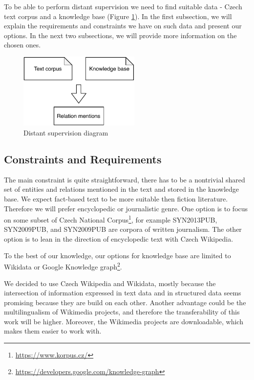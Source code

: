 To be able to perform distant supervision we need to find suitable data - Czech text corpus and a knowledge base (Figure \ref{obr03:DSD}). In the first subsection, we will explain the requirements and constraints we have on such data and present our options. In the next two subsections, we will provide more information on the chosen ones.

\begin{figure}[h]\centering
\includegraphics[width=60mm]{./img//Diplomka diagramy-Distant supervision}
\caption{Distant supervision diagram}
\label{obr03:DSD}
\end{figure}

\subsection{Constraints and Requirements}
The main constraint is quite straightforward, there has to be a nontrivial shared set of entities and relations mentioned in the text and stored in the knowledge base. We expect fact-based text to be more suitable then fiction literature. Therefore we will prefer encyclopedic or journalistic genre. One option is to focus on some subset of Czech National Corpus\footnote{\url{https://www.korpus.cz/}}, for example SYN2013PUB, SYN2009PUB, and SYN2009PUB are corpora of written journalism. The other option is to lean in the direction of encyclopedic text with Czech Wikipedia.

To the best of our knowledge, our options for knowledge base are limited to Wikidata or Google Knowledge graph\footnote{\url{https://developers.google.com/knowledge-graph}}.

We decided to use Czech Wikipedia and Wikidata, mostly because the intersection of information expressed in text data and in structured data seems promising because they are build on each other. Another advantage could be the multilingualism of Wikimedia projects, and therefore the transferability of this work will be higher. Moreover, the Wikimedia projects are downloadable, which makes them easier to work with.


